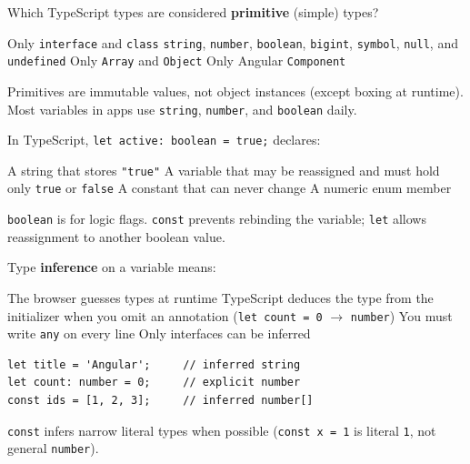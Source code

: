 \question[4]
Which TypeScript types are considered \textbf{primitive} (simple) types?
\begin{choices}
  \choice Only \texttt{interface} and \texttt{class}
  \CorrectChoice \lstinline[style=tsinline]|string|, \lstinline[style=tsinline]|number|, \lstinline[style=tsinline]|boolean|, \lstinline[style=tsinline]|bigint|, \lstinline[style=tsinline]|symbol|, \lstinline[style=tsinline]|null|, and \lstinline[style=tsinline]|undefined|
  \choice Only \lstinline[style=tsinline]|Array| and \lstinline[style=tsinline]|Object|
  \choice Only Angular \lstinline[style=tsinline]|Component|
\end{choices}
\begin{solution}
  Primitives are immutable values, not object instances (except boxing at runtime). Most variables in apps use \lstinline[style=tsinline]|string|, \lstinline[style=tsinline]|number|, and \lstinline[style=tsinline]|boolean| daily.
\end{solution}

\question[4]
In TypeScript, \lstinline[style=tsinline]|let active: boolean = true;| declares:
\begin{choices}
  \choice A string that stores \texttt{"true"}
  \CorrectChoice A variable that may be reassigned and must hold only \texttt{true} or \texttt{false}
  \choice A constant that can never change
  \choice A numeric enum member
\end{choices}
\begin{solution}
  \lstinline[style=tsinline]|boolean| is for logic flags. \lstinline[style=tsinline]|const| prevents rebinding the variable; \lstinline[style=tsinline]|let| allows reassignment to another boolean value.
\end{solution}

\question[4]
Type \textbf{inference} on a variable means:
\begin{choices}
  \choice The browser guesses types at runtime
  \CorrectChoice TypeScript deduces the type from the initializer when you omit an annotation (\lstinline[style=tsinline]|let count = 0| $\rightarrow$ \texttt{number})
  \choice You must write \lstinline[style=tsinline]|any| on every line
  \choice Only interfaces can be inferred
\end{choices}
\begin{solution}
\begin{lstlisting}[style=ts]
let title = 'Angular';     // inferred string
let count: number = 0;     // explicit number
const ids = [1, 2, 3];     // inferred number[]
\end{lstlisting}
  \lstinline[style=tsinline]|const| infers narrow literal types when possible (\lstinline[style=tsinline]|const x = 1| is literal \lstinline[style=tsinline]|1|, not general \lstinline[style=tsinline]|number|).
\end{solution}

